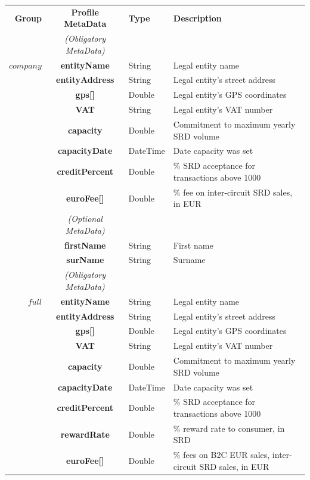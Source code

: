 \setlength{\tabcolsep}{5pt}
\begin{table}[H]
\begin{centering}
\small
{
\begin{tabular}{ r | c | l | l }
\textbf{Group}	& {\bf Profile MetaData} & {\bf Type} & {\bf Description} \\
\Xhline{1.5pt}
			& \emph{(Obligatory MetaData)} & & \\
\cline{2-2}
$company$	& {\bf entityName}			&String	& Legal entity name \\
			& {\bf entityAddress}			&String	& Legal entity's street address \\
			& {\bf gps[]}				&Double	& Legal entity's GPS coordinates \\
			& {\bf VAT}				&String	& Legal entity's VAT number \\
			& {\bf capacity}				&Double	& Commitment to maximum yearly SRD volume \\
			& {\bf capacityDate}			&DateTime & Date capacity was set \\
			& {\bf creditPercent}			&Double	& \% SRD acceptance for transactions above 1000 \\
			& {\bf euroFee[]}			&Double	& \% fee on inter-circuit SRD sales, in EUR \\
\cline{2-2}
			 & \emph{(Optional MetaData)}& & \\
\cline{2-2}
			& {\bf firstName	}			&String & First name \\
			& {\bf surName}			&String & Surname \\
\Xhline{1.5pt}
			& \emph{(Obligatory MetaData)} & & \\
\cline{2-2}
$full$		& {\bf entityName}			&String	& Legal entity name \\
			& {\bf entityAddress}			&String	& Legal entity's street address \\
			& {\bf gps[]}				&Double	& Legal entity's GPS coordinates \\
			& {\bf VAT}				&String	& Legal entity's VAT number \\
			& {\bf capacity}				&Double	& Commitment to maximum yearly SRD volume \\
			& {\bf capacityDate}			&DateTime & Date capacity was set \\
			& {\bf creditPercent}			&Double	& \% SRD acceptance for transactions above 1000 \\
			& {\bf rewardRate}			&Double	& \% reward rate to consumer, in SRD \\
			& {\bf euroFee[]}			&Double	& \% fees on B2C EUR sales, inter-circuit SRD sales, in EUR \\

\end{tabular}}
\end{centering}
\end{table}
